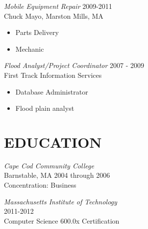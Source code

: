 \documentclass[line,margin]{res}
\begin{document}
\begin{resume}
\begin{itemize}
                  \end{itemize}
 

                {\sl Mobile Equipment Repair} \hfill 2009-2011 \\
                Chuck Mayo, Marston Mills, MA
                  \begin{itemize}
                  \item Parts Delivery
                  \item Mechanic
                  \end{itemize}  
                  
                   {\sl Flood Analyst/Project Coordinator } \hfill 2007 - 2009 \\
                First Track Information Services
                  \begin{itemize}  \itemsep -2pt %
                  \item  Database Administrator
                  \item  Flood plain analyst
                  \end{itemize} 

\section{EDUCATION} {\sl Cape Cod Community College} \\
                Barnstable, MA 
                2004 through 2006 \\
                Concentration: Business

                {\sl Massachusetts Institute of Technology } \\
                2011-2012 \\
                Computer Science 600.0x Certification\\
 

\end{resume}
\end{document}
